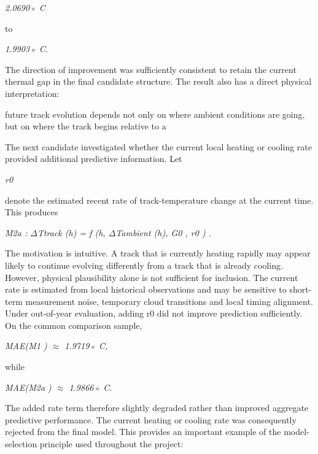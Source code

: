 \begin{center}\textit{2.0690◦ C}\end{center}

to

\begin{center}\textit{1.9903◦ C.}\end{center}

The direction of improvement was sufficiently consistent to retain the current thermal gap in the final candidate structure. The result also has a direct physical interpretation:

future track evolution depends not only on where ambient conditions are going, but on where the track begins relative to a

The next candidate investigated whether the current local heating or cooling rate provided additional predictive information. Let

\begin{center}\textit{r0}\end{center}

denote the estimated recent rate of track-temperature change at the current time. This produces

\begin{center}\textit{M2a :     \ensuremath{\Delta}Ttrack (h) = f (h, \ensuremath{\Delta}Tambient (h), G0 , r0 ) .}\end{center}

The motivation is intuitive. A track that is currently heating rapidly may appear likely to continue evolving differently from a track that is already cooling. However, physical plausibility alone is not sufficient for inclusion. The current rate is estimated from local historical observations and may be sensitive to short-term measurement noise, temporary cloud transitions and local timing alignment. Under out-of-year evaluation, adding r0 did not improve prediction sufficiently. On the common comparison sample,

\begin{center}\textit{MAE(M1 ) \ensuremath{\approx} 1.9719◦ C,}\end{center}

while

\begin{center}\textit{MAE(M2a ) \ensuremath{\approx} 1.9866◦ C.}\end{center}

The added rate term therefore slightly degraded rather than improved aggregate predictive performance. The current heating or cooling rate was consequently rejected from the final model. This provides an important example of the model-selection principle used throughout the project:

